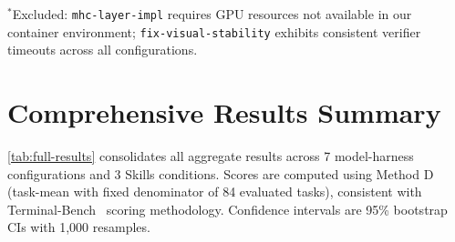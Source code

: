 \noindent $^*$Excluded: \texttt{mhc-layer-impl} requires GPU resources not available in our container environment; \texttt{fix-visual-stability} exhibits consistent verifier timeouts across all configurations.




\section{Comprehensive Results Summary}
\label{app:results-summary}

\autoref{tab:full-results} consolidates all aggregate results across 7 model-harness configurations and 3 Skills conditions. Scores are computed using Method D (task-mean with fixed denominator of 84 evaluated tasks), consistent with Terminal-Bench~\citep{merrill2026terminalbenchbenchmarkingagentshard} scoring methodology. Confidence intervals are 95\% bootstrap CIs with 1,000 resamples.

